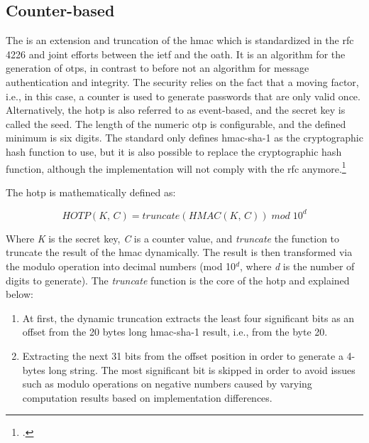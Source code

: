 \subsection{Counter-based}
\label{subsec:hotp}

The  is an extension and truncation of the \gls{hmac} which is standardized in the \gls{rfc} 4226 and joint efforts between the \gls{ietf} and the \gls{oath}. It is an algorithm for the generation of \glspl{otp}, in contrast to before not an algorithm for message authentication and integrity. The security relies on the fact that a \frqq moving factor\flqq{}, i.e., in this case, a counter is used to generate passwords that are only valid once. Alternatively, the \gls{hotp} is also referred to as event-based, and the secret key is called the seed. The length of the numeric \gls{otp} is configurable, and the defined minimum is six digits. The standard only defines \gls{hmac}-\gls{sha}-1 as the cryptographic hash function to use, but it is also possible to replace the cryptographic hash function, although the implementation will not comply with the \gls{rfc} anymore.\footcites[See][]{m2005rfc}[See][Chapter 3]{9781849287333}

The \gls{hotp} is mathematically defined as:

\begin{equation*}
	HOTP(K,\, C) = truncate(HMAC(K,\, C))\; mod \; 10^d
\end{equation*}

Where \textit{K} is the secret key, \textit{C} is a counter value, and \textit{truncate} the function to truncate the result of the \gls{hmac} dynamically. The result is then transformed via the modulo operation into decimal numbers 	(mod 10$^d$, where \textit{d} is the number of digits to generate). The \textit{truncate} function is the core of the \gls{hotp} and explained below:

\begin{enumerate}
	\item At first, the dynamic truncation extracts the least four significant bits as an offset from the 20 bytes long \gls{hmac}-\gls{sha}-1 result, i.e., from the byte 20.
	\item Extracting the next 31 bits from the offset position in order to generate a 4-bytes long string. The most significant bit is skipped in order to avoid issues such as modulo operations on negative numbers caused by varying computation results based on implementation differences.
\end{enumerate}

